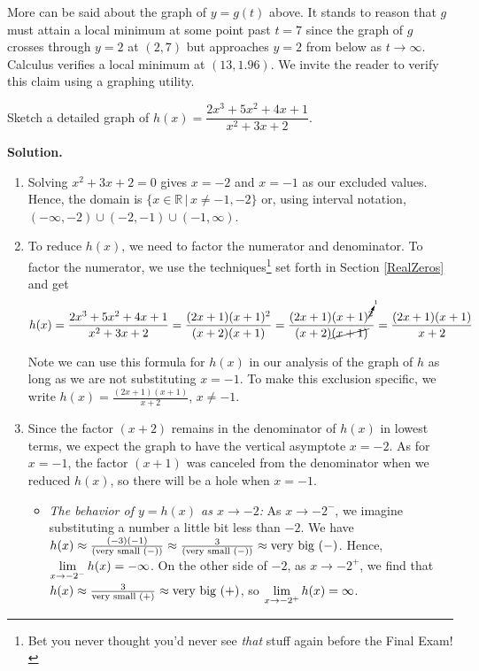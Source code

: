 \documentclass{ximera}
\begin{document}
More can be said about the graph of $y = g(t)$ above.   It stands to reason that $g$ must attain a local  minimum at some point past $t=7$ since the graph of $g$ crosses through $y=2$  at $(2,7)$ but approaches $y=2$ from below as $t \rightarrow \infty$.  Calculus verifies a local minimum at $(13, 1.96)$.  We invite the reader to verify this claim using a graphing utility. 

\begin{ex}  Sketch a detailed graph of $h(x) = \dfrac{2x^3+5x^2+4x+1}{x^2+3x+2}$.

{ \bf Solution.}  

\begin{enumerate}

\item   Solving $x^2+3x+2 = 0$ gives $x = -2$ and $x=-1$ as our excluded values.  Hence, the domain is $\{ x \in \mathbb{R} \, | \, x \neq -1, -2 \}$ or, using interval notation,  $(-\infty, -2) \cup (-2, -1) \cup (-1, \infty)$.

\item  To reduce $h(x)$, we need to factor the numerator and denominator.  To factor the numerator, we use the techniques\footnote{Bet you never thought you'd never see \textit{that} stuff again before the Final Exam!} set forth in Section \ref{RealZeros} and get  \[h(x) =  \dfrac{2x^3+5x^2+4x+1}{x^2+3x+2} = \dfrac{(2x+1)(x+1)^2}{(x+2)(x+1)} = \dfrac{ (2x+1) (x+1)^{\cancelto{1}{2}}  }{(x+2)\cancel{(x+1)}} = \dfrac{(2x+1)(x+1)}{x+2} \]

Note we can use this formula for $h(x)$ in our analysis of the graph of $h$ as long as we are not substituting $x=-1$.  To make this exclusion specific, we write $h(x) = \frac{(2x+1)(x+1)}{x+2}$, $x \neq -1$.

\item  Since the factor $(x+2)$ remains in the denominator of $h(x)$ in lowest terms, we expect the graph to have the vertical asymptote $x=-2$.  As for $x=-1$, the factor $(x+1)$ was canceled from the denominator when we reduced $h(x)$, so there will be a hole when $x=-1$.   

\begin{itemize}

\item  \textit{The behavior of $y=h(x)$ as $x \rightarrow -2$:}  As $x \rightarrow -2^{-}$, we imagine substituting a number a little bit less than $-2$. We have $h(x) \approx \frac{(-3)(-1)}{(\text{\scriptsize very small $(-)$})} \approx \frac{3}{(\text{\scriptsize very small $(-)$})}\approx \text{very big $(-)$}$.  Hence,  $\ds{\lim_{x \rightarrow -2^{-}} h(x) = - \infty}$.  On the other side of $-2$, as $x \rightarrow -2^{+}$, we find that $h(x) \approx \frac{3}{\text{\scriptsize very small $(+)$}} \approx \text{very big $(+)$}$, so  $\ds{\lim_{x \rightarrow -2^{+}} h(x) =  \infty}$.


\end{itemize}
\end{enumerate}
\end{ex}
\end{document}
